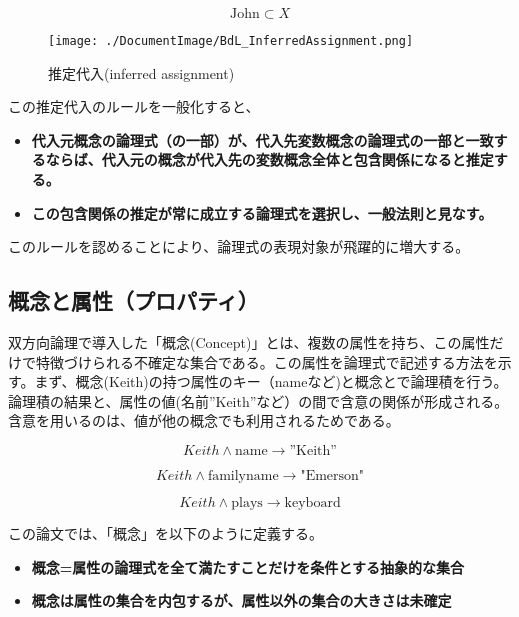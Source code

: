 \documentclass[12pt]{article}
\begin{document}
\begin{equation} \text{John} \subset X \end{equation}

\begin{figure}[ht]
  \centering
  \texttt{[image: ./DocumentImage/BdL\_InferredAssignment.png]}
  \caption{推定代入(inferred assignment)}
  \label{fig:推定代入}
\end{figure}


この推定代入のルールを一般化すると、

\begin{itemize}
\item
  \textbf{代入元概念の論理式（の一部）が、代入先変数概念の論理式の一部と一致するならば、代入元の概念が代入先の変数概念全体と包含関係になると推定する。}
\item
  \textbf{この包含関係の推定が常に成立する論理式を選択し、一般法則と見なす。}
\end{itemize}

このルールを認めることにより、論理式の表現対象が飛躍的に増大する。

\subsection{概念と属性（プロパティ）}\label{ux6982ux5ff5ux3068ux5c5eux6027ux30d7ux30edux30d1ux30c6ux30a3}

双方向論理で導入した「概念(Concept)」とは、複数の属性を持ち、この属性だけで特徴づけられる不確定な集合である。この属性を論理式で記述する方法を示す。まず、概念(Keith)の持つ属性のキー（nameなど)と概念とで論理積を行う。論理積の結果と、属性の値(名前''Keith''など）の間で含意の関係が形成される。含意を用いるのは、値が他の概念でも利用されるためである。

\begin{equation} Keith \wedge \text{name} \rightarrow \text{”Keith”}\end{equation}

\begin{equation} Keith \wedge \text{familyname} \rightarrow \text{"Emerson"}\end{equation}

\begin{equation} Keith \wedge \text{plays} \rightarrow \text{keyboard}\end{equation}

この論文では、「概念」を以下のように定義する。

\begin{itemize}
\item
  \textbf{概念=属性の論理式を全て満たすことだけを条件とする抽象的な集合}
\item
  \textbf{概念は属性の集合を内包するが、属性以外の集合の大きさは未確定}
\end{itemize}
\end{document}
